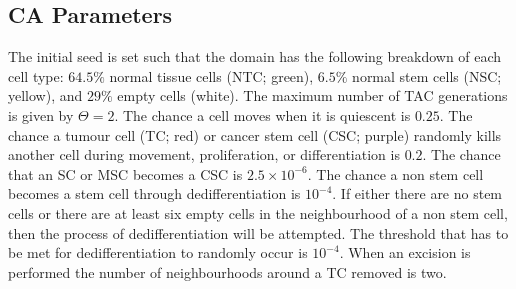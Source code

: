 \documentclass[\main/thesis.tex]{subfiles}
\begin{document}
\subsection{CA Parameters}

The initial seed is set such that the domain has the following breakdown of each cell type: $64.5 \%$ normal tissue cells (NTC; green), $6.5 \%$ normal stem cells (NSC; yellow), and $29 \%$ empty cells (white). The maximum number of TAC generations is given by $\Theta {=} 2$. The chance a cell moves when it is quiescent is $0.25$. The chance a tumour cell (TC; red) or cancer stem cell (CSC; purple) randomly kills another cell during movement, proliferation, or differentiation is $0.2$. The chance that an SC or MSC becomes a CSC is $2.5{\times}10^{\minus 6}$. The chance a non stem cell becomes a stem cell through dedifferentiation is $10^{\minus 4}$. If either there are no stem cells or there are at least six empty cells in the neighbourhood of a non stem cell, then the process of dedifferentiation will be attempted. The threshold that has to be met for dedifferentiation to randomly occur is $10^{{\minus}4}$. When an excision is performed the number of neighbourhoods around a TC removed is two.
\end{document}
